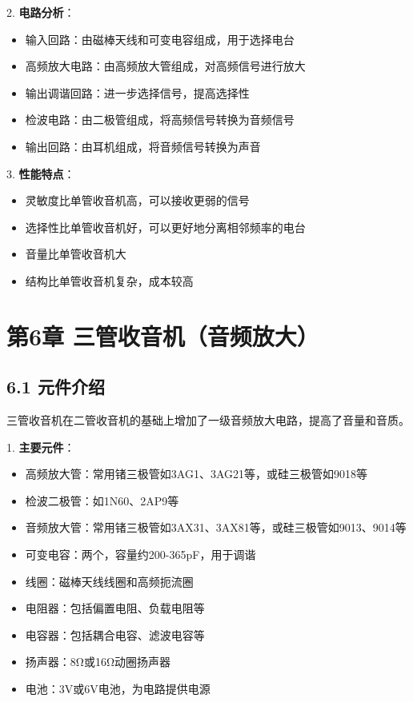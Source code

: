 \documentclass[12pt,UTF8]{ctexbook}
\begin{document}
2. \textbf{电路分析}：
   \begin{itemize}[leftmargin=3.5em]
   \item 输入回路：由磁棒天线和可变电容组成，用于选择电台
   \item 高频放大电路：由高频放大管组成，对高频信号进行放大
   \item 输出调谐回路：进一步选择信号，提高选择性
   \item 检波电路：由二极管组成，将高频信号转换为音频信号
   \item 输出回路：由耳机组成，将音频信号转换为声音
   \end{itemize}

3. \textbf{性能特点}：
   \begin{itemize}[leftmargin=3.5em]
   \item 灵敏度比单管收音机高，可以接收更弱的信号
   \item 选择性比单管收音机好，可以更好地分离相邻频率的电台
   \item 音量比单管收音机大
   \item 结构比单管收音机复杂，成本较高
   \end{itemize}

\chapter*{第6章 三管收音机（音频放大）}
\section*{6.1 元件介绍}

三管收音机在二管收音机的基础上增加了一级音频放大电路，提高了音量和音质。

1. \textbf{主要元件}：
   \begin{itemize}[leftmargin=3.5em]
   \item 高频放大管：常用锗三极管如3AG1、3AG21等，或硅三极管如9018等
   \item 检波二极管：如1N60、2AP9等
   \item 音频放大管：常用锗三极管如3AX31、3AX81等，或硅三极管如9013、9014等
   \item 可变电容：两个，容量约200-365pF，用于调谐
   \item 线圈：磁棒天线线圈和高频扼流圈
   \item 电阻器：包括偏置电阻、负载电阻等
   \item 电容器：包括耦合电容、滤波电容等
   \item 扬声器：8Ω或16Ω动圈扬声器
   \item 电池：3V或6V电池，为电路提供电源
   \end{itemize}
\end{document}
